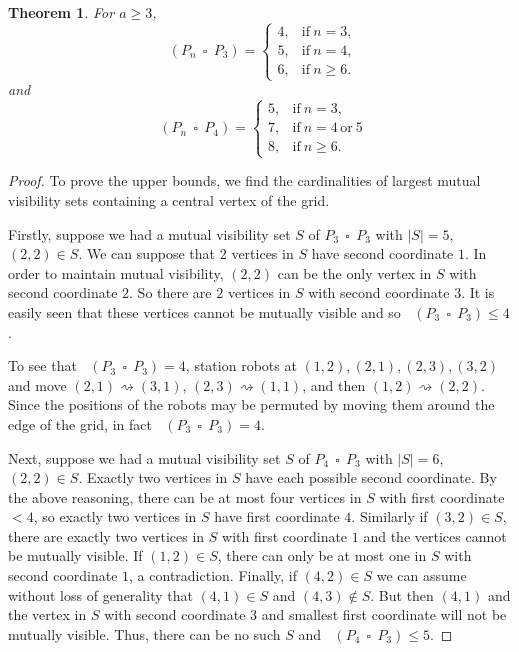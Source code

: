 \documentclass[a4paper,12pt]{article}
\DeclareMathOperator{\mobmv}{Mob_{\mu}}
\DeclareMathOperator{\cmobmv}{Mob^*_{\mu}}
\DeclareMathOperator{\cp}{\,\square\,}
\newtheorem{theorem}{Theorem}[section]
\theoremstyle{definition}
\newcommand{\move}{\rightsquigarrow}
\begin{document}
	\begin{theorem}
		For $a \geq 3$,		 
		\[\mobmv(P_n \cp P_3) =
		\begin{cases}
			4, & \text{if}\ n = 3, \\
			5, & \text{if}\ n = 4, \\
			6, & \text{if}\ n \geq 6.
		\end{cases} \] and \[ \mobmv(P_n \cp P_4) =
		\begin{cases}
			5, & \text{if}\ n = 3, \\
			7, & \text{if}\ n = 4 \,\text{or}\ 5 \\
			8, & \text{if}\ n \geq 6.
		\end{cases}
		\]
		\label{smallcartgrids}
	\end{theorem}
	\begin{proof}
		To prove the upper bounds, we find the cardinalities of largest mutual visibility sets containing a central vertex of the grid.
		
		Firstly, suppose we had a mutual visibility set $S$ of $P_3 \cp P_3$ with $|S| = 5$, $(2,2) \in S$. We can suppose that $2$ vertices in $S$ have second coordinate $1$. In order to maintain mutual visibility, $(2,2)$ can be the only vertex in $S$ with second coordinate $2$. So there are $2$ vertices in $S$ with second coordinate $3$. It is easily seen that these vertices cannot be mutually visible and so $\mobmv(P_3 \cp P_3) \leq 4$.
		
		To see that $\mobmv(P_3 \cp P_3) = 4$, station robots at $(1,2), (2,1), (2,3), (3,2)$ and move $(2,1) \move (3,1)$, $(2,3) \move (1,1)$, and then $(1,2) \move (2,2)$. Since the positions of the robots may be permuted by moving them around the edge of the grid, in fact $\cmobmv(P_3 \cp P_3) = 4$.
		
		Next, suppose we had a mutual visibility set $S$ of $P_4 \cp P_3$ with $|S| = 6$, $(2,2) \in S$. Exactly two vertices in $S$ have each possible second coordinate. By the above reasoning, there can be at most four vertices in $S$ with first coordinate $<4$, so exactly two vertices in $S$ have first coordinate $4$. Similarly if $(3,2) \in S$, there are exactly two vertices in $S$ with first coordinate $1$ and the vertices cannot be mutually visible. If $(1,2) \in S$, there can only be at most one in $S$ with second coordinate $1$, a contradiction. Finally, if $(4,2) \in S$ we can assume without loss of generality that $(4,1) \in S$ and $(4,3) \notin S$. But then $(4,1)$ and the vertex in $S$ with second coordinate $3$ and smallest first coordinate will not be mutually visible. Thus, there can be no such $S$ and $\mobmv(P_4 \cp P_3) \leq 5$.
		

\end{proof}
\end{document}
